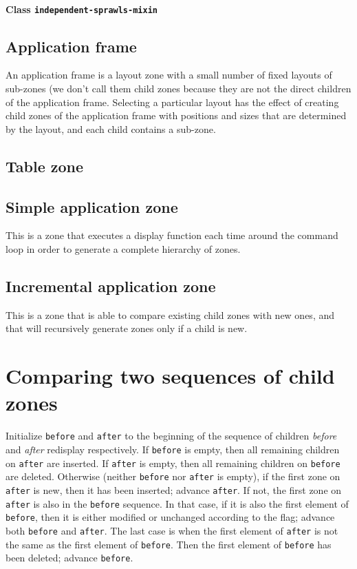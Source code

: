 \documentclass{report}
\def\code#1{\texttt{#1}}
\begin{document}
\subsubsection{Class \texttt{independent-sprawls-mixin}}

\section{Application frame}

An application frame is a layout zone with a small number of fixed
layouts of sub-zones (we don't call them child zones because they
are not the direct children of the application frame.  Selecting a
particular layout has the effect of creating child zones of the
application frame with positions and sizes that are determined by the
layout, and each child contains a sub-zone.

\section{Table zone}

\section{Simple application zone}

This is a zone that executes a display function each time around the
command loop in order to generate a complete hierarchy of zones.

\section{Incremental application zone}

This is a zone that is able to compare existing child zones with
new ones, and that will recursively generate zones only if a child
is new. 

\chapter{Comparing two sequences of child zones}

Initialize \code{before} and \code{after} to the beginning of the
sequence of children \emph{before} and \emph{after} redisplay
respectively.  If \code{before} is empty, then all remaining children
on \code{after} are inserted.  If \code{after} is empty, then all
remaining children on \code{before} are deleted.  Otherwise (neither
\code{before} nor \code{after} is empty), if the first zone on
\code{after} is new, then it has been inserted; advance \code{after}.
If not, the first zone  on \code{after} is also in the \code{before}
sequence.  In that case, if it is also the first element of
\code{before}, then it is either modified or unchanged according to
the flag; advance both \code{before} and \code{after}.  The last case
is when the first element of \code{after} is not the same as the first
element of \code{before}.  Then the first element of \code{before} has
been deleted; advance \code{before}. 
\end{document}
